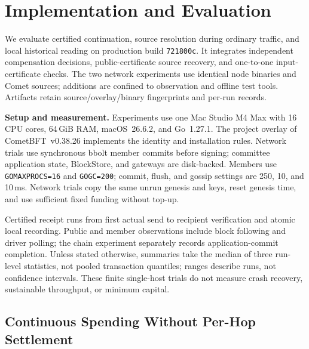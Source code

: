 
\section{Implementation and Evaluation}
\label{sec:evaluation}

We evaluate certified continuation, source resolution during ordinary
traffic, and local historical reading on production build
\texttt{721800c}. It integrates independent compensation decisions,
public-certificate source recovery, and one-to-one input-certificate
checks. The two network experiments use identical node binaries and
Comet sources; additions are confined to observation and offline test
tools. Artifacts retain source/overlay/binary fingerprints and per-run records.

\noindent\textbf{Setup and measurement.}
Experiments use one Mac Studio M4 Max with 16 CPU cores, 64\,GiB RAM,
macOS~26.6.2, and Go~1.27.1. The project overlay of CometBFT~v0.38.26
implements the identity and installation rules. Network trials use
synchronous bbolt member commits before signing; committee application
state, BlockStore, and gateways are disk-backed. Members use
\texttt{GOMAXPROCS=16} and \texttt{GOGC=200}; commit, flush, and gossip
settings are 250, 10, and 10\,ms. Network trials copy the same unrun genesis and keys, reset genesis time,
and use sufficient fixed funding without top-up.

Certified receipt runs from first actual send to recipient verification
and atomic local recording. Public and member observations include
block following and driver polling; the chain experiment separately records
application-commit completion. Unless stated otherwise, summaries take
the median of three run-level statistics, not pooled transaction
quantiles; ranges describe runs, not confidence intervals. These finite single-host trials do not measure crash recovery,
sustainable throughput, or minimum capital.

\subsection{Continuous Spending Without Per-Hop Settlement}
\label{sec:eval-continuation}

